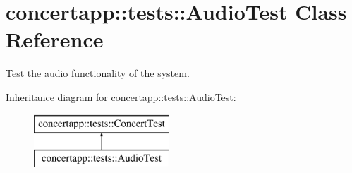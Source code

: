 \hypertarget{classconcertapp_1_1tests_1_1_audio_test}{
\section{concertapp::tests::AudioTest Class Reference}
\label{classconcertapp_1_1tests_1_1_audio_test}
}


Test the audio functionality of the system.  


Inheritance diagram for concertapp::tests::AudioTest:\begin{figure}[H]
\begin{center}
\leavevmode
\includegraphics[height=2.000000cm]{classconcertapp_1_1tests_1_1_audio_test}
\end{center}
\end{figure}
